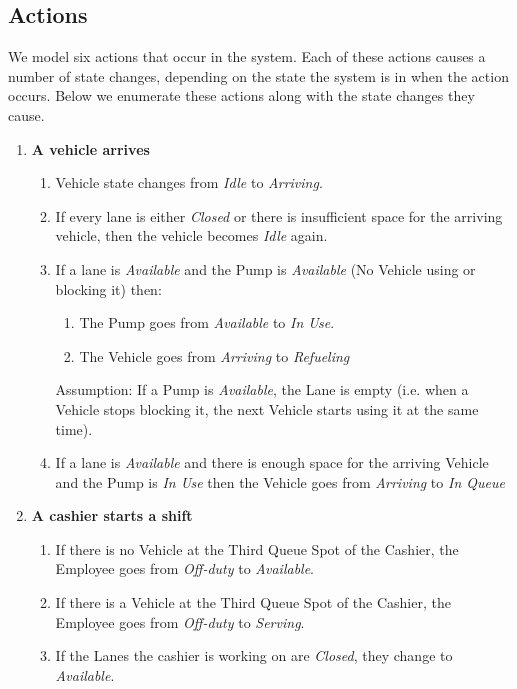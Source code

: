 \subsection{Actions}
We model six actions that occur in the system.
Each of these actions causes a number of state changes, depending on the state the system is in when the action occurs.
Below we enumerate these actions along with the state changes they cause.

\begin{enumerate}
	\item \textbf{A vehicle arrives}
	\begin{enumerate}
		\item Vehicle state changes from \textit{Idle} to \textit{Arriving}.
		\item If every lane is either \textit{Closed} or there is insufficient space for the arriving vehicle, then the vehicle becomes \textit{Idle} again.
		\item If a lane is \textit{Available} and the Pump is \textit{Available} (No Vehicle using or blocking it) then:
	\begin{enumerate}
		\item The Pump goes from \textit{Available} to \textit{In Use}.
		\item The Vehicle goes from \textit{Arriving} to \textit{Refueling}
	\end{enumerate}
	Assumption: If a Pump is \textit{Available}, the Lane is empty (i.e. when a Vehicle stops blocking it, the next Vehicle starts using it at the same time).
	\item If a lane is \textit{Available} and there is enough space for the arriving Vehicle and the Pump is \textit{In Use} then the Vehicle goes from \textit{Arriving} to \textit{In Queue}
	\end{enumerate}
	
	\item \textbf{A cashier starts a shift}
	\begin{enumerate}
		\item If there is no Vehicle at the Third Queue Spot of the Cashier, the Employee goes from \textit{Off-duty} to \textit{Available}.
		\item If there is a Vehicle at the Third Queue Spot of the Cashier, the Employee goes from \textit{Off-duty} to \textit{Serving}.
		\item If the Lanes the cashier is working on are \textit{Closed}, they change to \textit{Available}.
	\end{enumerate}
	

\end{enumerate}
